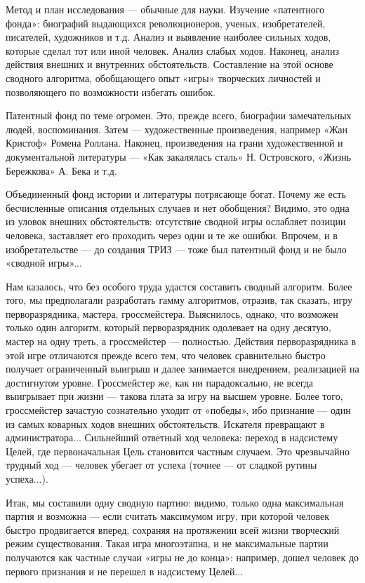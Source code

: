 Метод и  план исследования —  обычные для науки.  Изучение «патентного
фонда»:  биографий выдающихся  революционеров, ученых,  изобретателей,
писателей,  художников  и т.д.  Анализ  и  выявление наиболее  сильных
ходов,  которые сделал  тот  или иной  человек.  Анализ слабых  ходов.
Наконец,   анализ  действия   внешних   и  внутренних   обстоятельств.
Составление на этой основе сводного алгоритма, обобщающего опыт «игры»
творческих личностей и позволяющего по возможности избегать ошибок.

Патентный  фонд   по  теме  огромен.  Это,   прежде  всего,  биографии
замечательных    людей,   воспоминания.    Затем   —    художественные
произведения,   например  «Жан   Кристоф»  Ромена   Роллана.  Наконец,
произведения  на грани  художественной и  документальной литературы  —
«Как закалялась  сталь» Н.  Островского, «Жизнь  Бережкова» А.  Бека и
т.д.

Объединенный  фонд истории  и литературы  потрясающе богат.  Почему же
есть бесчисленные описания отдельных  случаев и нет обобщения? Видимо,
это  одна из  уловок  внешних обстоятельств:  отсутствие сводной  игры
ослабляет позиции человека,  заставляет его проходить через  одни и те
же ошибки. Впрочем, и в изобретательстве — до создания ТРИЗ — тоже был
патентный фонд и не было «сводной игры»...


Нам  казалось,  что  без   особого  труда  удастся  составить  сводный
алгоритм. Более  того, мы  предполагали разработать  гамму алгоритмов,
отразив,  так сказать,  игру перворазрядника,  мастера, гроссмейстера.
Выяснилось,  однако,  что  возможен   только  один  алгоритм,  который
перворазрядник  одолевает  на  одну  десятую, мастер  на  одну  треть,
а  гроссмейстер  — полностью.  Действия  перворазрядника  в этой  игре
отличаются прежде всего тем,  что человек сравнительно быстро получает
ограниченный  выигрыш  и   далее  занимается  внедрением,  реализацией
на  достигнутом  уровне. Гроссмейстер  же,  как  ни парадоксально,  не
всегда  выигрывает  при  жизни  —  такова  плата  за  игру  на  высшем
уровне.  Более  того,  гроссмейстер  зачастую  сознательно  уходит  от
«победы»,  ибо  признание  —  один из  самых  коварных  ходов  внешних
обстоятельств.  Искателя  превращают  в  администратора...  Сильнейший
ответный ход человека: переход  в надсистему Целей, где первоначальная
Цель становится частным случаем. Это чрезвычайно трудный ход — человек
убегает от успеха (точнее — от сладкой рутины успеха...).

Итак,  мы   составили  одну   сводную  партию:  видимо,   только  одна
максимальная партия  и возможна  — если  считать максимумом  игру, при
которой  человек быстро  продвигается вперед,  сохраняя на  протяжении
всей жизни  творческий режим существования. Такая  игра многоэтапна, и
не  максимальные партии  получаются  как частные  случаи  «игры не  до
конца»: например,  дошел человек до  первого признания и не  перешел в
надсистему Целей...


